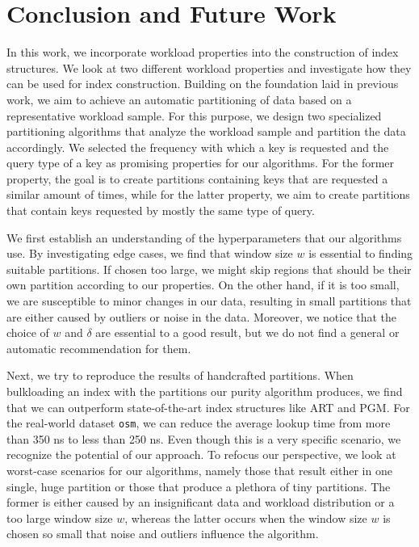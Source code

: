 \chapter{Conclusion and Future Work}\label{sec:conclusion}
In this work, we incorporate workload properties into the construction of index structures. We look at two different workload properties and investigate how they can be used for index construction. Building on the foundation laid in previous work, we aim to achieve an automatic partitioning of data based on a representative workload sample. For this purpose, we design two specialized partitioning algorithms that analyze the workload sample and partition the data accordingly. We selected the frequency with which a key is requested and the query type of a key as promising properties for our algorithms. For the former property, the goal is to create partitions containing keys that are requested a similar amount of times, while for the latter property, we aim to create partitions that contain keys requested by mostly the same type of query. 

We first establish an understanding of the hyperparameters that our algorithms use. By investigating edge cases, we find that window size $w$ is essential to finding suitable partitions. If chosen too large, we might skip regions that should be their own partition according to our properties. On the other hand, if it is too small, we are susceptible to minor changes in our data, resulting in small partitions that are either caused by outliers or noise in the data. Moreover, we notice that the choice of $w$ and $\delta$ are essential to a good result, but we do not find a general or automatic recommendation for them.

Next, we try to reproduce the results of handcrafted partitions. When bulkloading an index with the partitions our purity algorithm produces, we find that we can outperform state-of-the-art index structures like ART and PGM. For the real-world dataset \verb|osm|, we can reduce the average lookup time from more than 350 ns to less than 250 ns. Even though this is a very specific scenario, we recognize the potential of our approach. To refocus our perspective, we look at worst-case scenarios for our algorithms, namely those that result either in one single, huge partition or those that produce a plethora of tiny partitions. The former is either caused by an insignificant data and workload distribution or a too large window size $w$, whereas the latter occurs when the window size $w$ is chosen so small that noise and outliers influence the algorithm. 

